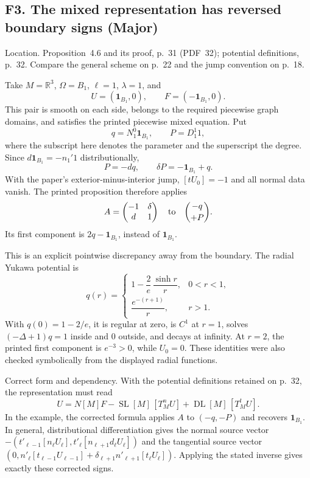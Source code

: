 \documentclass[10pt]{article}
\begin{document}
\subsection*{F3. The mixed representation has reversed boundary signs (Major)}
Location. Proposition 4.6 and its proof, p. 31 (PDF 32); potential definitions, p. 32. Compare the general scheme on p. 22 and the jump convention on p. 18.\par
Take \(M=\mathbb R^3\), \(\Omega=B_1\), \(\ell=1\), \(\lambda=1\), and \[U=(\mathbf1_{B_1},0),\qquad F=(-\mathbf1_{B_1},0).\] This pair is smooth on each side, belongs to the required piecewise graph domains, and satisfies the printed piecewise mixed equation. Put \[q=N_1^0\mathbf1_{B_1},\qquad P=D_1^1 1,\] where the subscript here denotes the parameter and the superscript the degree. Since \(d\mathbf1_{B_1}=-n_1'1\) distributionally, \[P=-dq,\qquad \delta P=-\mathbf1_{B_1}+q.\] With the paper’s exterior-minus-interior jump, \([tU_0]=-1\) and all normal data vanish. The printed proposition therefore applies \[A=\begin{pmatrix}-1&\delta\\d&1\end{pmatrix}
 \quad\hbox{to}\quad
 \binom{-q}{+P}.\] Its first component is \(2q-\mathbf1_{B_1}\), instead of \(\mathbf1_{B_1}\).\par
This is an explicit pointwise discrepancy away from the boundary. The radial Yukawa potential is \[q(r)=
 \begin{cases}
 1-\dfrac2e\,\dfrac{\sinh r}{r},&0<r<1,\\[4pt]
 \dfrac{e^{-(r+1)}}r,&r>1.
 \end{cases}\] With \(q(0)=1-2/e\), it is regular at zero, is \(C^1\) at \(r=1\), solves \((-\Delta+1)q=1\) inside and \(0\) outside, and decays at infinity. At \(r=2\), the printed first component is \(e^{-3}>0\), while \(U_0=0\). These identities were also checked symbolically from the displayed radial functions.\par
Correct form and dependency. With the potential definitions retained on p. 32, the representation must read \[U=N[M]F-\operatorname{SL}[M]\,[T_M^nU]+\operatorname{DL}[M]\,[T_M^tU].\] In the example, the corrected formula applies \(A\) to \((-q,-P)\) and recovers \(\mathbf1_{B_1}\). In general, distributional differentiation gives the normal source vector \(-(t'_{\ell-1}[n_\ell U_\ell],t'_\ell[n_{\ell+1}d_\ell U_\ell])\) and the tangential source vector \((0,n'_\ell[t_{\ell-1}U_{\ell-1}]+\delta_{\ell+1}n'_{\ell+1}[t_\ell U_\ell])\). Applying the stated inverse gives exactly these corrected signs.\par
\end{document}

